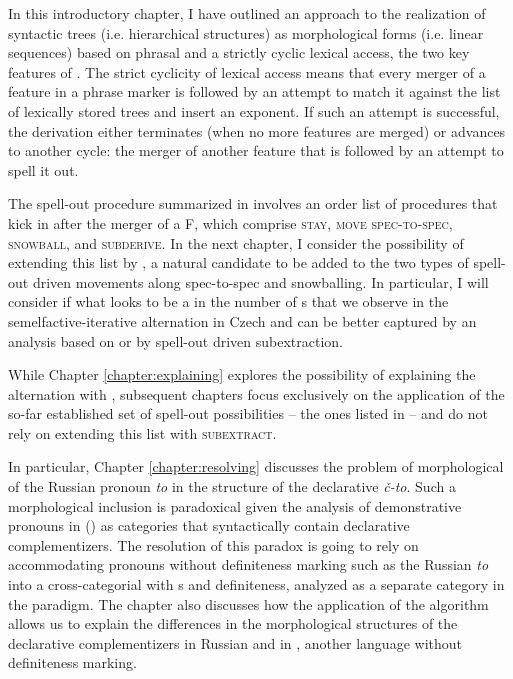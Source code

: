 In this introductory chapter, I have outlined an approach to the realization of syntactic trees (i.e. hierarchical  structures) as morphological forms (i.e. linear sequences) based on phrasal  and a strictly cyclic lexical access, the two key features of . The strict cyclicity of lexical access  means that  every merger of a feature in a phrase marker is followed by an attempt to match it against the list of lexically stored trees and insert an exponent. If such an attempt is successful, the derivation either terminates (when no more features are merged) or advances to another cycle: the merger of another feature that is followed by an attempt to spell it out.
\par
The spell-out procedure summarized in  involves an order list of procedures that kick in after the merger of a  F, which comprise \textsc{stay}, \textsc{move spec-to-spec}, \textsc{snowball}, and \textsc{subderive}. In the next chapter, I consider the possibility of extending this list by , a natural candidate to be added to the two types of spell-out driven movements along spec-to-spec and snowballing. In particular, I will consider if what looks to be a  in the number of s that we observe in the semelfactive-iterative alternation  in Czech and  can be better captured by an analysis based on  or by spell-out driven subextraction.
\par
While Chapter \ref{chapter:explaining} explores the possibility of explaining the alternation with , subsequent chapters focus exclusively on the application of the so-far established set of spell-out possibilities -- the ones listed in  -- and do not rely on extending this list with \textsc{subextract}. 
\par
In particular, Chapter \ref{chapter:resolving} discusses the problem of morphological  of the Russian  pronoun \textit{to} in the structure of the declarative  \textit{\v{c}-to}. Such a morphological inclusion is paradoxical given the analysis of demonstrative pronouns in \citeauthor{BaunazLander2017} (\citeyear{BaunazLander2017,Baunaz-Lander-Glossa}) as categories that syntactically contain declarative complementizers. The resolution of this paradox is going to rely on accommodating  pronouns without definiteness marking such as the Russian \textit{to} into a cross-categorial  with s and definiteness, analyzed as a separate category in the paradigm. The chapter also discusses how the application of the  algorithm allows us to explain the differences in the morphological structures of the declarative complementizers in Russian and in , another  language without definiteness marking.

